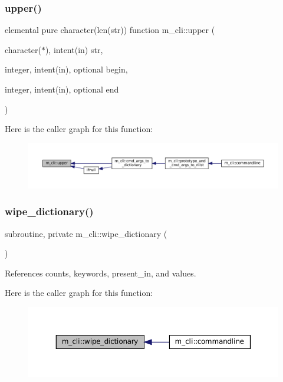 \subsubsection{\texorpdfstring{upper()}{upper()}}
{\footnotesize\ttfamily elemental pure character(len(str)) function m\+\_\+cli\+::upper (\begin{DoxyParamCaption}\item[{character($\ast$), intent(in)}]{str,  }\item[{integer, intent(in), optional}]{begin,  }\item[{integer, intent(in), optional}]{end }\end{DoxyParamCaption})\hspace{0.3cm}{\ttfamily [private]}}

Here is the caller graph for this function\+:
\nopagebreak
\begin{figure}[H]
\begin{center}
\leavevmode
\includegraphics[width=350pt]{namespacem__cli_aef6f54c9cb37251dfd664c0845186a40_icgraph}
\end{center}
\end{figure}
\mbox{\label{namespacem__cli_a3c1b30406fc692841826be979726bb1b}} 
\subsubsection{\texorpdfstring{wipe\+\_\+dictionary()}{wipe\_dictionary()}}
{\footnotesize\ttfamily subroutine, private m\+\_\+cli\+::wipe\+\_\+dictionary (\begin{DoxyParamCaption}{ }\end{DoxyParamCaption})\hspace{0.3cm}{\ttfamily [private]}}



References counts, keywords, present\+\_\+in, and values.

Here is the caller graph for this function\+:
\nopagebreak
\begin{figure}[H]
\begin{center}
\leavevmode
\includegraphics[width=350pt]{namespacem__cli_a3c1b30406fc692841826be979726bb1b_icgraph}
\end{center}
\end{figure}



